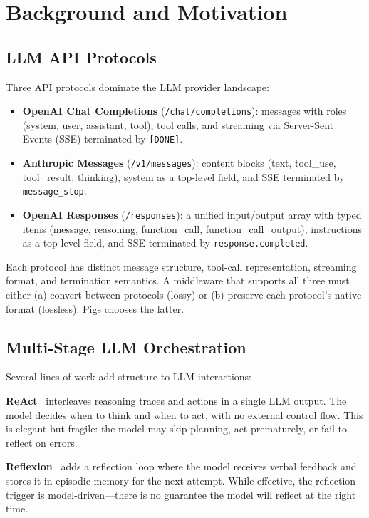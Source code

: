 \section{Background and Motivation}
\label{sec:bg}

\subsection{LLM API Protocols}

Three API protocols dominate the LLM provider landscape:

\begin{itemize}[nosep]
    \item \textbf{OpenAI Chat Completions} (\texttt{/chat/completions}): messages with roles (system, user, assistant, tool), tool calls, and streaming via Server-Sent Events (SSE) terminated by \texttt{[DONE]}.
    \item \textbf{Anthropic Messages} (\texttt{/v1/messages}): content blocks (text, tool\_use, tool\_result, thinking), system as a top-level field, and SSE terminated by \texttt{message\_stop}.
    \item \textbf{OpenAI Responses} (\texttt{/responses}): a unified input/output array with typed items (message, reasoning, function\_call, function\_call\_output), instructions as a top-level field, and SSE terminated by \texttt{response.completed}.
\end{itemize}

Each protocol has distinct message structure, tool-call representation, streaming format, and termination semantics. A middleware that supports all three must either (a) convert between protocols (lossy) or (b) preserve each protocol's native format (lossless). Pigs chooses the latter.

\subsection{Multi-Stage LLM Orchestration}

Several lines of work add structure to LLM interactions:

\textbf{ReAct}~\citep{yao2022react} interleaves reasoning traces and actions in a single LLM output. The model decides when to think and when to act, with no external control flow. This is elegant but fragile: the model may skip planning, act prematurely, or fail to reflect on errors.

\textbf{Reflexion}~\citep{shinn2023reflexion} adds a reflection loop where the model receives verbal feedback and stores it in episodic memory for the next attempt. While effective, the reflection trigger is model-driven---there is no guarantee the model will reflect at the right time.


